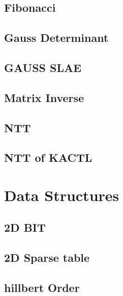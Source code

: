 \subsection{Fibonacci}
\raggedbottom
\hrulefill
\subsection{Gauss Determinant}
\raggedbottom
\hrulefill
\subsection{GAUSS SLAE}
\raggedbottom
\hrulefill
\subsection{Matrix Inverse}
\raggedbottom
\hrulefill
\subsection{NTT}
\raggedbottom
\hrulefill
\subsection{NTT of KACTL}
\raggedbottom
\hrulefill

\section{Data Structures}
\subsection{2D BIT}
\raggedbottom
\hrulefill
\subsection{2D Sparse table}
\raggedbottom
\hrulefill
\subsection{hillbert Order}
\raggedbottom
\hrulefill
